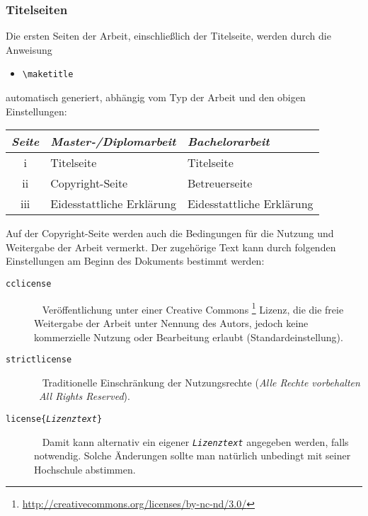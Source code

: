 \subsubsection{Titelseiten}

Die ersten Seiten der Arbeit, einschließlich der Titelseite,
werden durch die Anweisung
\begin{itemize}
\item[] \verb!\maketitle!  
\end{itemize}
automatisch generiert, abhängig vom Typ der Arbeit und den obigen
Einstellungen:
%
\begin{center}
\begin{tabular}{cll}
\emph{Seite} & \emph{Master-/Diplomarbeit} & \emph{Bachelorarbeit} \\
  \hline
  {\rm i} & Titelseite & Titelseite \\
  {\rm ii} & Copyright-Seite & Betreuerseite \\
  {\rm iii} & Eidesstattliche Erklärung & Eidesstattliche Erklärung \\
  \hline
\end{tabular}
\end{center}
%
Auf der Copyright-Seite werden auch die Bedingungen für die Nutzung 
und Weitergabe der Arbeit vermerkt. Der zugehörige Text kann durch
folgenden Einstellungen am Beginn des Dokuments bestimmt werden:
%
\begin{description}
\item[\normalfont\texttt{{\bs}cclicense}] ~ \newline
	Veröffentlichung unter einer Creative Commons%
	\footnote{\url{http://creativecommons.org/licenses/by-nc-nd/3.0/}}
	Lizenz, die die freie Weitergabe der Arbeit unter Nennung des Autors, jedoch
	keine kommerzielle Nutzung oder Bearbeitung erlaubt
	(Standardeinstellung).
\item[\normalfont\texttt{{\bs}strictlicense}] ~ \newline 
	Traditionelle Einschränkung der Nutzungsrechte 
	(\emph{Alle Rechte vorbehalten} \bzw\ \emph{All Rights Reserved}).
\item[\normalfont\texttt{{\bs}license\{\emph{Lizenztext}\}}] ~ \newline
	Damit kann alternativ ein eigener \texttt{\emph{Lizenztext}} angegeben werden, 
	falls notwendig. Solche Änderungen sollte man natürlich unbedingt mit seiner 
	Hochschule abstimmen.
\end{description}





